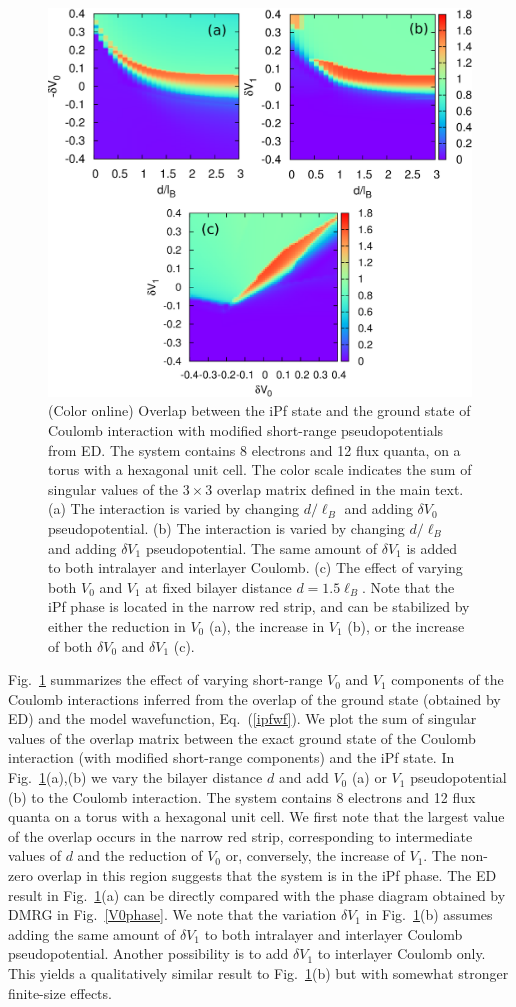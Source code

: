 \begin{figure}%
	\includegraphics[width=0.6\linewidth]{figures/overlap_ED.eps}
	\caption{%
		(Color online)
		Overlap between the iPf state and the ground state of Coulomb interaction with modified short-range pseudopotentials from ED.
		The system contains 8 electrons and 12 flux quanta, on a torus with a hexagonal unit cell. The color scale indicates the sum of singular values of the $3\times3$ overlap matrix defined in the main text.
		(a) The interaction is varied by changing $d/\ell_B$ and adding $\delta V_0$ pseudopotential.
		(b) The interaction is varied by changing $d/\ell_B$ and adding $\delta V_1$ pseudopotential. The same amount of $\delta V_1$ is added to both intralayer and interlayer Coulomb. 
		(c) The effect of varying both $V_0$ and $V_1$ at fixed bilayer distance $d=1.5\ell_B$. Note that the iPf phase is located in the narrow red strip, and can be stabilized by either the reduction in $V_0$ (a), the increase in $V_1$ (b), or the increase of both $\delta V_0$ and $\delta V_1$ (c).		
	}
	\label{overlap}
\end{figure}
Fig.~\ref{overlap} summarizes the effect of varying short-range $V_0$ and $V_1$ components of the Coulomb interactions inferred from the overlap of the ground state (obtained by ED) and the model wavefunction, Eq.~(\ref{ipfwf}). 
We plot the sum of singular values of the overlap matrix between the exact ground state of the Coulomb interaction (with modified short-range components) and the iPf state. In Fig.~\ref{overlap}(a),(b) we vary the bilayer distance $d$ and add $V_0$ (a) or $V_1$ pseudopotential (b) to the Coulomb interaction. The system contains 8 electrons and 12 flux quanta on a torus with a hexagonal unit cell.
We first note that the largest value of the overlap occurs in the narrow red strip, corresponding to intermediate values of $d$ and the reduction of $V_0$ or, conversely, the increase of $V_1$. The non-zero overlap in this region suggests that the system is in the iPf phase.
The ED result in Fig.~\ref{overlap}(a) can be directly compared with the phase diagram obtained by DMRG in Fig.~\ref{V0phase}.
We note that the variation $\delta V_1$ in Fig.~\ref{overlap}(b) assumes adding the same amount of $\delta V_1$ to both intralayer and interlayer Coulomb pseudopotential. Another possibility is to add $\delta V_1$ to interlayer Coulomb only. This yields a qualitatively similar result to Fig.~\ref{overlap}(b) but with somewhat stronger finite-size effects.


